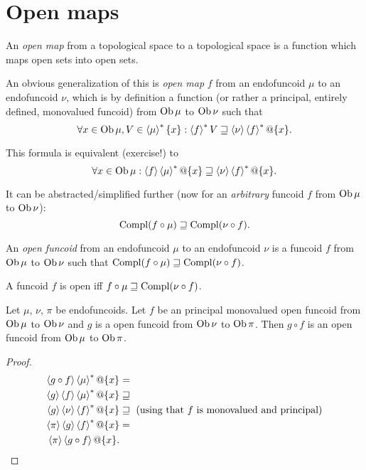 \section{Open maps}
\begin{defn}
An \emph{open map} from a topological space to a
topological space is a function which maps open sets into open sets.
\end{defn}
An obvious generalization of this is \emph{open map} $f$ from an
endofuncoid $\mu$ to an endofuncoid $\nu$, which is by definition
a function (or rather a principal, entirely defined, monovalued funcoid)
from $\operatorname{Ob}\mu$ to $\operatorname{Ob}\nu$ such that
\[
\forall x\in\operatorname{Ob}\mu,V\in\left\langle \mu\right\rangle ^{\ast}\{x\}:\left\langle f\right\rangle ^{\ast}V\sqsupseteq\left\langle \nu\right\rangle\left\langle f\right\rangle ^{\ast}@\{x\}.
\]


This formula is equivalent (exercise!) to
\[
\forall x\in\operatorname{Ob}\mu:\left\langle f\right\rangle\left\langle \mu\right\rangle ^{\ast}@\{x\}\sqsupseteq\left\langle \nu\right\rangle\left\langle f\right\rangle ^{\ast}@\{x\}.
\]


It can be abstracted/simplified further (now for an \emph{arbitrary}
funcoid $f$ from $\operatorname{Ob}\mu$ to $\operatorname{Ob}\nu$):
\[
\operatorname{Compl}(f\circ\mu)\sqsupseteq\operatorname{Compl}(\nu\circ f).
\]

\begin{defn}
An \emph{open funcoid} from an endofuncoid $\mu$
to an endofuncoid $\nu$ is a funcoid $f$ from $\operatorname{Ob}\mu$ to $\operatorname{Ob}\nu$
such that $\operatorname{Compl}(f\circ\mu)\sqsupseteq\operatorname{Compl}(\nu\circ f)$.\end{defn}
\begin{obvious}
A funcoid $f$ is open iff $f\circ\mu\sqsupseteq\operatorname{Compl}(\nu\circ f)$.\end{obvious}
\begin{thm}
Let $\mu$, $\nu$, $\pi$ be endofuncoids. Let $f$ be an
principal monovalued open funcoid from $\operatorname{Ob}\mu$ to $\operatorname{Ob}\nu$ and $g$ is a open funcoid
from $\operatorname{Ob}\nu$ to $\operatorname{Ob}\pi$. Then $g\circ f$ is an open funcoid from
$\operatorname{Ob}\mu$ to $\operatorname{Ob}\pi$.\end{thm}
\begin{proof}
\begin{align*}
\supfun{g\circ f}\rsupfun{\mu}@\{x\} & = \\
\supfun{g}\supfun{f}\rsupfun{\mu}@\{x\} & \sqsupseteq \\
\supfun{g}\supfun{\nu}\rsupfun{f}@\{x\} & \sqsupseteq \text{ (using that $f$ is monovalued and principal)}\\
\supfun{\pi}\supfun{g}\rsupfun{f}@\{x\} & = \\
\supfun{\pi}\supfun{g\circ f}@\{x\}.
\end{align*}
\end{proof}


